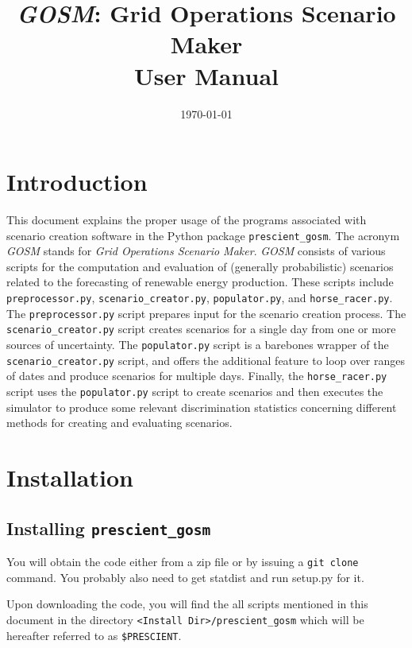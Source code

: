 \documentclass[11pt]{article}
\begin{document}
\title{\textsl{GOSM}: Grid Operations Scenario Maker \\ User Manual}
\date{\today}

\maketitle

\section{Introduction}
This document explains the proper usage of the programs associated with scenario creation software in the Python package \texttt{prescient\_gosm}. 
The acronym \textit{GOSM} stands for \textit{Grid Operations Scenario Maker}. \textit{GOSM} consists of various scripts for the computation 
and evaluation of (generally probabilistic) scenarios related to the forecasting of renewable energy production. These scripts include 
\texttt{preprocessor.py}, \texttt{scenario\_creator.py}, \texttt{populator.py}, and \texttt{horse\_racer.py}. The \texttt{preprocessor.py} script
prepares input   for the scenario creation process. The \texttt{scenario\_creator.py} script creates scenarios for a single day from 
one or more sources of uncertainty. The \texttt{populator.py} script is a barebones wrapper of the \texttt{scenario\_creator.py} script, and
offers the additional feature to loop over ranges of dates and produce scenarios for multiple days. Finally, the \texttt{horse\_racer.py} script
uses the \texttt{populator.py} script to create scenarios and then executes the simulator  to produce some 
relevant discrimination statistics concerning different methods for creating and evaluating scenarios.

\section{Installation}

\subsection{Installing \texttt{prescient\_gosm}}
You will obtain the code either from a zip file or by issuing a \texttt{git clone} command. You probably also need to get statdist and run setup.py for it.

Upon downloading the code, you will find the all scripts mentioned in this document in the directory \texttt{<Install Dir>/prescient\_gosm} which will be hereafter referred to as \texttt{\$PRESCIENT}.
\end{document}
